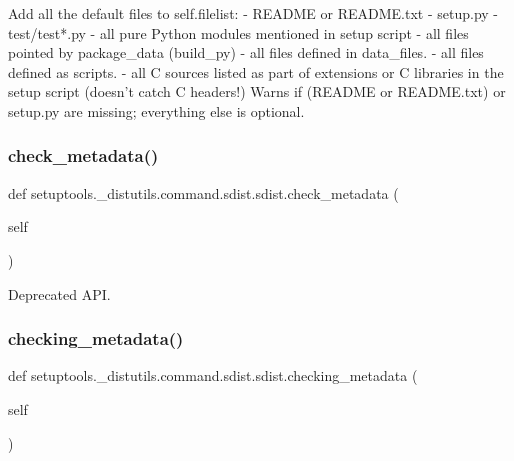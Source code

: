 \begin{DoxyVerb}Add all the default files to self.filelist:
  - README or README.txt
  - setup.py
  - test/test*.py
  - all pure Python modules mentioned in setup script
  - all files pointed by package_data (build_py)
  - all files defined in data_files.
  - all files defined as scripts.
  - all C sources listed as part of extensions or C libraries
    in the setup script (doesn't catch C headers!)
Warns if (README or README.txt) or setup.py are missing; everything
else is optional.
\end{DoxyVerb}
 \mbox{\label{classsetuptools_1_1__distutils_1_1command_1_1sdist_1_1sdist_a7389217eb6f4551f1d27bdc94811ae11}} 
\subsubsection{\texorpdfstring{check\+\_\+metadata()}{check\_metadata()}}
{\footnotesize\ttfamily def setuptools.\+\_\+distutils.\+command.\+sdist.\+sdist.\+check\+\_\+metadata (\begin{DoxyParamCaption}\item[{}]{self }\end{DoxyParamCaption})}

\begin{DoxyVerb}Deprecated API.\end{DoxyVerb}
 \mbox{\label{classsetuptools_1_1__distutils_1_1command_1_1sdist_1_1sdist_a5d4fd7cfb6001724ed1c00e5b45c5fb6}} 
\subsubsection{\texorpdfstring{checking\+\_\+metadata()}{checking\_metadata()}}
{\footnotesize\ttfamily def setuptools.\+\_\+distutils.\+command.\+sdist.\+sdist.\+checking\+\_\+metadata (\begin{DoxyParamCaption}\item[{}]{self }\end{DoxyParamCaption})}

